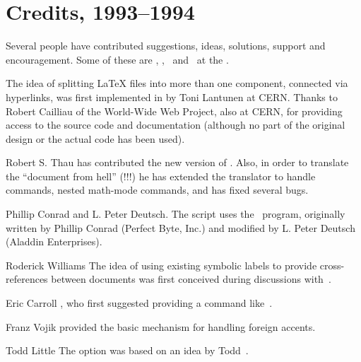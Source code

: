 \section*{Credits, 1993--1994\label{credits}}%
\html{\\}%
Several people have contributed suggestions, ideas, solutions, support
and encouragement. Some of these are \RodWilliams, \AnaPaiva, 
\JamilSawar\ and \AndrewCole\ at the \CBLU.

\begin{htmllist}
%
\item [\CERN]
The idea of splitting \LaTeX{}  files
into more than one component, connected via hyperlinks, 
was first implemented in \Perl{} by Toni Lantunen at CERN.
Thanks to Robert Cailliau 
of the World-Wide Web Project, also at CERN, 
for providing access to the source code and documentation 
(although no part of the original design or the actual code has been used).


\item [Robert S. Thau] 
has contributed the new version of . 
Also, in order to translate the ``document from hell'' (!!!) 
he has extended the translator to handle  commands, 
nested math-mode commands, and has fixed several bugs.

\item [Phillip Conrad and L. Peter Deutsch.]
The  \Perl{} script uses the  \PS\ program, 
originally written by Phillip Conrad (Perfect Byte, Inc.) and 
modified by L. Peter Deutsch (Aladdin Enterprises).

\item [Roderick Williams]
The idea of using existing symbolic labels to provide cross-references
between documents was first conceived during discussions with 
\RodWilliams{} \,.


\item [Eric Carroll] , 
who first suggested providing a command like \,. 

%

\item [Franz Vojik] 
provided the basic mechanism for handling foreign accents.


\item [Todd Little]
The  option was based on an idea by Todd 
\,.



\end{htmllist}
